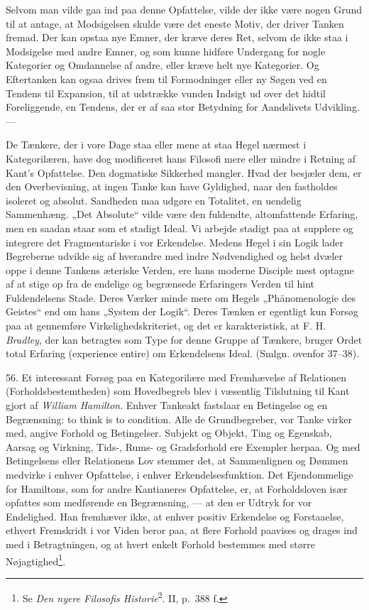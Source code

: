 \documentclass[12pt,a4paper]{book}
\newcommand{\apage}[1]{\marginnote{\footnotesize\textit{[#1]}}}
\begin{document}
Selvom man vilde gaa ind paa denne Opfattelse, vilde der ikke være nogen
Grund til at antage, at Modsigelsen skulde være det eneste Motiv, der
driver Tanken fremad. Der kan opstaa nye Emner, der kræve deres Ret,
selvom de ikke staa i Modsigelse med andre Emner, og som kunne hidføre
Undergang for nogle Kategorier og Omdannelse af andre, eller kræve helt
nye Kategorier. Og Eftertanken kan ogsaa drives frem til Formodninger
eller ny Søgen ved en Tendens til Expansion, til at udstrække vunden
Indsigt ud over det hidtil Foreliggende, en Tendens, der er af saa stor
Betydning for Aandslivets Udvikling. \apage{150} ---

De Tænkere, der i vore Dage staa eller mene at staa Hegel nærmest i
Kategorilæren, have dog modificeret hans Filosofi mere eller mindre i
Retning af Kant's Opfattelse. Den dogmatiske Sikkerhed mangler. Hvad der
besjæler dem, er den Overbevisning, at ingen Tanke kan have Gyldighed,
naar den fastholdes isoleret og absolut. Sandheden maa udgøre en
Totalitet, en uendelig Sammenhæng. „Det Absolute“ vilde være den
fuldendte, altomfattende Erfaring, men en saadan staar som et stadigt
Ideal. Vi arbejde stadigt paa at supplere og integrere det
Fragmentariske i vor Erkendelse. Medens Hegel i sin Logik lader
Begreberne udvikle sig af hverandre med indre Nødvendighed og helst
dvæler oppe i denne Tankens æteriske Verden, ere hans moderne Disciple
mest optagne af at stige op fra de endelige og begrænsede Erfaringers
Verden til hint Fuldendelsens Stade. Deres Værker minde mere om Hegels
„Phänomenologie des Geistes“ end om hans „System der Logik“. Deres
Tænken er egentligt kun Forsøg paa at gennemføre Virkelighedskriteriet,
og det er karakteristisk, at F. H. \emph{Bradley}, der kan betragtes som
Type for denne Gruppe af Tænkere, bruger Ordet total Erfaring (experience
entire) om Erkendelsens Ideal. (Smlgn. ovenfor 37--38).

56. Et interessant Forsøg paa en Kategorilære med Fremhævelse af
Relationen (Forholdsbestemtheden) som Hovedbegreb blev i væsentlig
Tilslutning til Kant gjort af \emph{William Hamilton}. Enhver Tankeakt
fastslaar en Betingelse og en Begrænsning: to think is to condition. Alle
de Grundbegreber, vor Tanke virker med, angive Forhold og Betingelser.
Subjekt og Objekt, Ting og Egenskab, Aarsag og Virkning, Tids-, Rums- og
Gradsforhold ere Exempler herpaa. Og med Betingelsens eller Relationens
Lov stemmer det, at Sammenlignen og Dømmen medvirke i enhver
Opfattelse, i enhver Erkendelsesfunktion. Det Ejendommelige for
Hamiltons, som for andre Kantianeres Opfattelse, er, at Forholdsloven
især opfattes som medførende en Begrænsning, --- at den er Udtryk for vor
Endelighed. Han fremhæver ikke, at enhver positiv Erkendelse og
Forstaaelse, ethvert \apage{151}
Fremskridt i vor Viden beror paa, at flere Forhold paavises og drages ind
med i Betragtningen, og at hvert enkelt Forhold bestemmes med større
Nøjagtighed\footnote{Se \emph{Den nyere Filosofis Historie}\textsuperscript{2}. II, p.~388 f.}.
\end{document}
